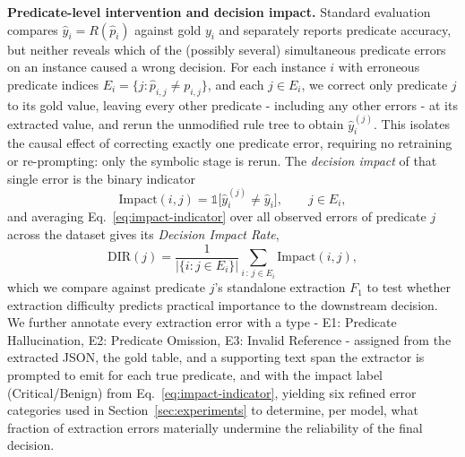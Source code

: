 \textbf{Predicate-level intervention and decision impact.}
Standard evaluation compares $\hat{y}_i = R(\hat{p}_i)$ against gold $y_i$ and separately reports predicate accuracy, but neither reveals which of the (possibly several) simultaneous predicate errors on an instance caused a wrong decision. For each instance $i$ with erroneous predicate indices $E_i = \{j : \hat{p}_{i,j} \neq p_{i,j}\}$, and each $j \in E_i$, we correct only predicate $j$ to its gold value, leaving every other predicate - including any other errors - at its extracted value, and rerun the unmodified rule tree to obtain $\hat{y}_i^{(j)}$. This isolates the causal effect of correcting exactly one predicate error, requiring no retraining or re-prompting: only the symbolic stage is rerun. The \emph{decision impact} of that single error is the binary indicator
\begin{equation}
\label{eq:impact-indicator}
\mathrm{Impact}(i,j) = \mathbb{1}\big[\hat{y}_i^{(j)} \neq \hat{y}_i\big], \qquad j \in E_i,
\end{equation}
and averaging Eq.~\ref{eq:impact-indicator} over all observed errors of predicate $j$ across the dataset gives its \emph{Decision Impact Rate},
\begin{equation}
\label{eq:dir}
\mathrm{DIR}(j) = \frac{1}{|\{i : j \in E_i\}|} \sum_{i \,:\, j \in E_i} \mathrm{Impact}(i,j),
\end{equation}
which we compare against predicate $j$'s standalone extraction $F_1$ to test whether extraction difficulty predicts practical importance to the downstream decision. We further annotate every extraction error with a type - E1: Predicate Hallucination, E2: Predicate Omission, E3: Invalid Reference - assigned from the extracted JSON, the gold table, and a supporting text span the extractor is prompted to emit for each true predicate, and with the impact label (Critical/Benign) from Eq.~\ref{eq:impact-indicator}, yielding six refined error categories used in Section~\ref{sec:experiments} to determine, per model, what fraction of extraction errors materially undermine the reliability of the final decision.

